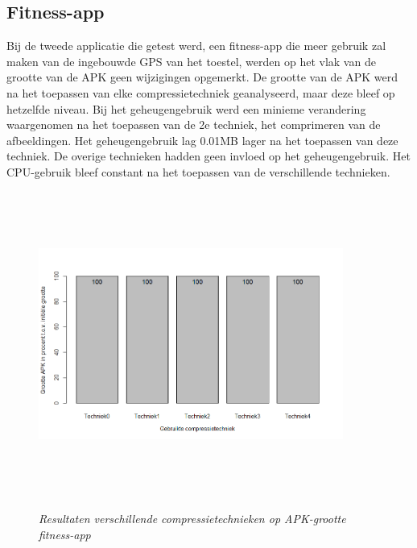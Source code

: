 \subsection{Fitness-app}
Bij de tweede applicatie die getest werd, een fitness-app die meer gebruik zal maken van de ingebouwde GPS van het toestel, werden op het vlak van de grootte van de APK geen wijzigingen opgemerkt. De grootte van de APK werd na het toepassen van elke compressietechniek geanalyseerd, maar deze bleef op hetzelfde niveau. Bij het geheugengebruik werd een minieme verandering waargenomen na het toepassen van de 2e techniek, het comprimeren van de afbeeldingen. Het geheugengebruik lag 0.01MB lager na het toepassen van deze techniek. De overige technieken hadden geen invloed op het geheugengebruik. Het CPU-gebruik bleef constant na het toepassen van de verschillende technieken.
\begin{figure}[H]
	\centering
	\caption{\textit{Resultaten verschillende compressietechnieken op APK-grootte fitness-app}}
	\includegraphics[width=10cm, height=10cm, keepaspectratio]{img/Rplot02}\\[.5cm]
	
\end{figure}
